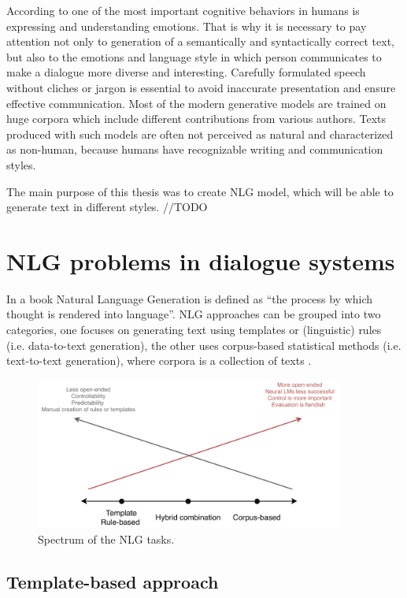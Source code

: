 According to \cite{salovey1990emotional} one of the most important cognitive behaviors in humans is expressing and understanding emotions. That is why it is necessary to pay attention not only to generation of a semantically and syntactically correct text, but also to the emotions and language style in which person communicates to make a dialogue more diverse and interesting. Carefully formulated speech without cliches or jargon is essential to avoid inaccurate presentation and ensure effective communication. Most of the modern generative models are trained on huge corpora which include different contributions from various authors. Texts produced with such models are often not perceived as natural and characterized as non-human, because humans have recognizable writing and communication styles.


The main purpose of this thesis was to create NLG model, which will be able to generate text in different styles.  //TODO


\chapter{NLG problems in dialogue systems}\label{nlg_problems}
In a book \cite{alder2017handbook} Natural Language Generation is defined as ``the process by which thought is rendered into language''. NLG approaches can be grouped into two categories, one focuses on generating text using templates or (linguistic) rules (i.e. data-to-text generation), the other uses corpus-based statistical methods (i.e. text-to-text generation), where corpora is a collection of texts \cite{oh2002stochastic}.


\begin{figure}[hbt]
  \centering
  \includegraphics[width=0.9\textwidth]{figures/templateVScorpus.pdf}
  \caption{Spectrum of the NLG tasks.}
  \label{nlg_spectum}
\end{figure}

\section{Template-based approach} 

